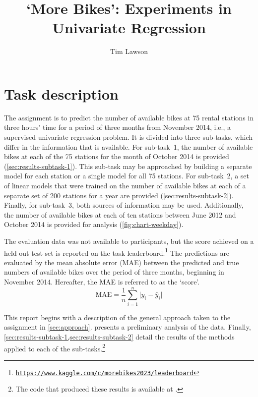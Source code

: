 \documentclass[11pt]{extarticle}
\newcommand{\kaggle}{https://www.kaggle.com/c/morebikes2023/leaderboard}
\begin{document}
\title{`More Bikes': Experiments in Univariate Regression}
\author[]{Tim Lawson}
\date{}

\maketitle

\section{Task description}

The assignment is to predict the number of available bikes at 75 rental stations in
three hours' time for a period of three months from November 2014, i.e., a supervised
univariate regression problem.
It is divided into three sub-tasks, which differ in the information that is available.
For sub-task~1, the number of available bikes at each of the 75 stations for the month
of October 2014 is provided (\cref{sec:results-subtask-1}).
This sub-task may be approached by building a separate model for each station or a
single model for all 75 stations.
For sub-task~2, a set of linear models that were trained on the number of available
bikes at each of a separate set of 200 stations for a year are provided
(\cref{sec:results-subtask-2}).
Finally, for sub-task~3, both sources of information may be used.
Additionally, the number of available bikes at each of ten stations between June 2012
and October 2014 is provided for analysis (\cref{fig:chart-weekday}).

The evaluation data was not available to participants, but the score achieved on a
held-out test set is reported on the task
leaderboard.\footnote{\href{\kaggle}{\texttt{\kaggle}}} The predictions are evaluated
by the mean absolute error (MAE) between the predicted and true numbers of available
bikes over the period of three months, beginning in November 2014.
Hereafter, the MAE is referred to as the `score'.
\begin{equation}
  \label{eq:mae}
  \text{MAE} = \frac{1}{n} \sum_{i = 1}^n \lvert y_i - \hat{y}_i \rvert
\end{equation}

This report begins with a description of the general approach taken to the assignment
in \cref{sec:approach}.
 presents a preliminary analysis of the data.
Finally, \cref{sec:results-subtask-1,sec:results-subtask-2} detail the results of the
methods applied to each of the sub-tasks.\footnote{The code that produced these results
  is available at .
}
\end{document}
